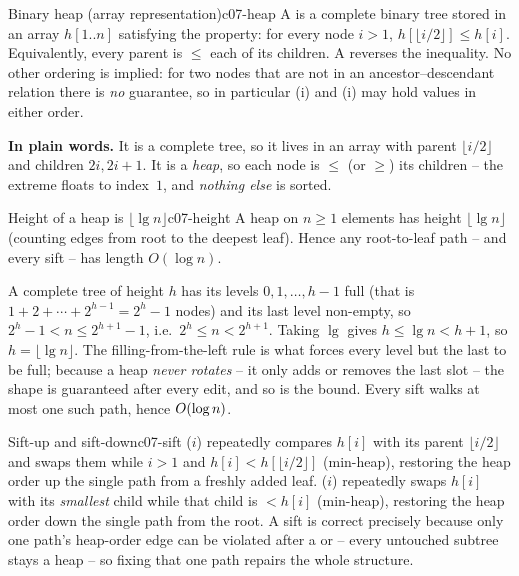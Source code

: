 \begin{definition}{Binary heap (array representation)}{c07-heap}
A  is a complete binary tree stored in an array $h[1..n]$ satisfying the
 property: for every node $i>1$, $h[\lfloor i/2\rfloor] \le h[i]$. Equivalently, every
parent is $\le$ each of its children. A  reverses the inequality. No other ordering is
implied: for two nodes that are not in an ancestor--descendant relation there is \emph{no} guarantee, so
in particular (i) and (i) may hold values in either order.
\end{definition}

\noindent\textbf{In plain words.} It is a complete tree, so it lives in an array with parent
$\lfloor i/2\rfloor$ and children $2i,2i+1$. It is a \emph{heap}, so each node is $\le$ (or $\ge$) its
children -- the extreme floats to index~$1$, and \emph{nothing else} is sorted.

\begin{lemma}{Height of a heap is $\lfloor\lg n\rfloor$}{c07-height}
A heap on $n\ge 1$ elements has height $\lfloor\lg n\rfloor$ (counting edges from root to the deepest
leaf). Hence any root-to-leaf path -- and every sift -- has length $O(\log n)$.
\end{lemma}
\begin{proofbox}
A complete tree of height $h$ has its levels $0,1,\dots,h-1$ full (that is $1+2+\cdots+2^{h-1}=2^{h}-1$
nodes) and its last level non-empty, so $2^{h}-1 < n \le 2^{h+1}-1$, i.e.\ $2^{h}\le n < 2^{h+1}$. Taking
$\lg$ gives $h \le \lg n < h+1$, so $h=\lfloor\lg n\rfloor$. The filling-from-the-left rule is what forces
every level but the last to be full; because a heap \emph{never rotates} -- it only adds or removes the
last slot -- the shape is guaranteed after every edit, and so is the bound. Every sift walks at most one
such path, hence $O(\log n)$.
\end{proofbox}

\begin{definition}{Sift-up and sift-down}{c07-sift}
($i$) repeatedly compares $h[i]$ with its parent $\lfloor i/2\rfloor$ and swaps them while
$i>1$ and $h[i] < h[\lfloor i/2\rfloor]$ (min-heap), restoring the heap order up the single path from a
freshly added leaf. ($i$) repeatedly swaps $h[i]$ with its \emph{smallest} child while
that child is $<h[i]$ (min-heap), restoring the heap order down the single path from the root. A sift is
correct precisely because only one path's heap-order edge can be violated after a  or 
-- every untouched subtree stays a heap -- so fixing that one path repairs the whole structure.
\end{definition}

